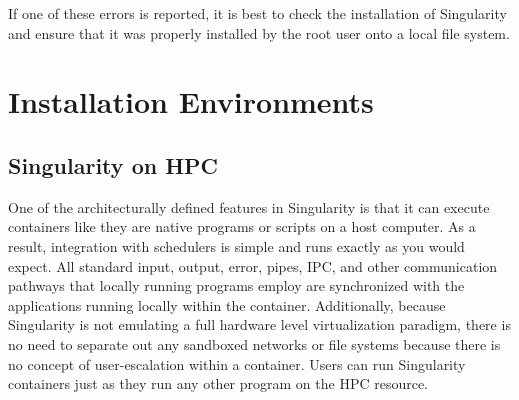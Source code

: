 \documentclass[letterpaper,10pt,english]{sphinxmanual}
\begin{document}
%
\begin{sphinxVerbatim}[commandchars=\\\{\}]
           

     
\end{sphinxVerbatim}

%
\begin{sphinxVerbatim}[commandchars=\\\{\}]
        

     
\end{sphinxVerbatim}

If one of these errors is reported, it is best to check the installation
of Singularity and ensure that it was properly installed by the root
user onto a local file system.


\chapter{Installation Environments}
\label{\detokenize{installation_environments:installation-environments}}\label{\detokenize{installation_environments::doc}}

\section{Singularity on HPC}
\label{\detokenize{installation_environments:singularity-on-hpc}}
One of the architecturally defined features in Singularity is that it
can execute containers like they are native programs or scripts on a
host computer. As a result, integration with schedulers is simple and
runs exactly as you would expect. All standard input, output, error,
pipes, IPC, and other communication pathways that locally running
programs employ are synchronized with the applications running locally
within the container.
Additionally, because Singularity is not emulating a full hardware
level virtualization paradigm, there is no need to separate out any
sandboxed networks or file systems because there is no concept of
user-escalation within a container. Users can run Singularity
containers just as they run any other program on the HPC resource.
\end{document}
